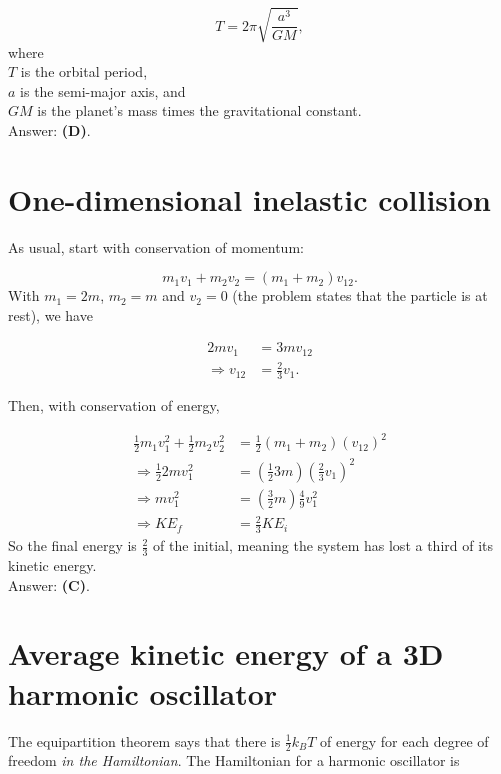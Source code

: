 \documentclass[11pt]{paper}
\newcommand{\answer}[1]{Answer: \textbf{(#1)}.}
\begin{document}
\begin{equation}
T = 2\pi \sqrt{\frac{a^3}{GM}},
\end{equation}
where\\
$T$ is the orbital period,\\
$a$ is the semi-major axis, and\\
$GM$ is the planet's mass times the gravitational constant.\\

\answer{D}

\section{One-dimensional inelastic collision}
As usual, start with conservation of momentum:

\begin{equation}
m_1 v_1 + m_2 v_2 = (m_1 + m_2) v_{12}.
\end{equation}
With $m_1 = 2m$, $m_2 = m$ and $v_2 = 0$ (the problem states that the particle is at rest), we have

\begin{align}
2m v_1 &= 3m v_{12}\\
\Rightarrow v_{12} &= \frac{2}{3} v_1.
\end{align}

Then, with conservation of energy,

\begin{align}
\frac{1}{2} m_1 v_1^2 + \frac{1}{2} m_2 v_2^2 &= \frac{1}{2} \left(m_1 + m_2\right) (v_{12})^2\\
\Rightarrow \frac{1}{2} 2 m v_1^2  &= \left(\frac{1}{2} 3 m\right) \left(\frac{2}{3} v_1\right)^2\\
\Rightarrow m v_1^2 &= \left(\frac{3}{2}m\right) \frac{4}{9} v_1^2\\
\Rightarrow KE_f &= \frac{2}{3} KE_i
\end{align}
So the final energy is $\frac{2}{3}$ of the initial, meaning the system has lost a third of its kinetic energy.\\

\answer{C}

\section{Average kinetic energy of a 3D harmonic oscillator}
The equipartition theorem says that there is $\frac{1}{2}k_B T$ of energy for each degree of freedom \emph{in the Hamiltonian}.  The Hamiltonian for a harmonic oscillator is 
\end{document}
